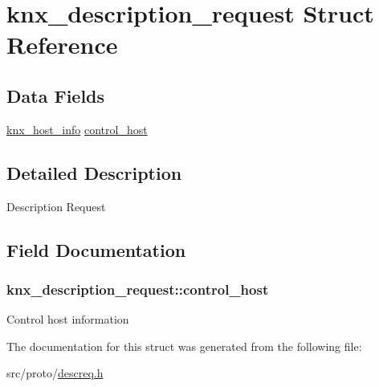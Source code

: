 \hypertarget{structknx__description__request}{}\section{knx\+\_\+description\+\_\+request Struct Reference}
\label{structknx__description__request}
\subsection*{Data Fields}
\begin{DoxyCompactItemize}
\item 
\hyperlink{structknx__host__info}{knx\+\_\+host\+\_\+info} \hyperlink{structknx__description__request_a6a21bb73a4332748b3d5ad0189ead339}{control\+\_\+host}
\end{DoxyCompactItemize}


\subsection{Detailed Description}
Description Request 

\subsection{Field Documentation}
\subsubsection[{\texorpdfstring{control\+\_\+host}{control_host}}]{ knx\+\_\+description\+\_\+request\+::control\+\_\+host}\hypertarget{structknx__description__request_a6a21bb73a4332748b3d5ad0189ead339}{}\label{structknx__description__request_a6a21bb73a4332748b3d5ad0189ead339}
Control host information 

The documentation for this struct was generated from the following file\+:\begin{DoxyCompactItemize}
\item 
src/proto/\hyperlink{descreq_8h}{descreq.\+h}\end{DoxyCompactItemize}
